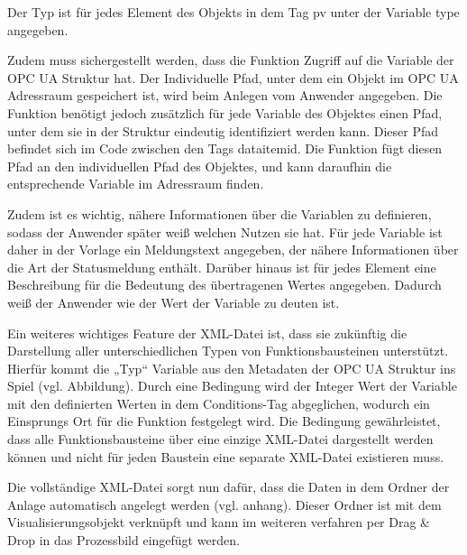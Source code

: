 Der Typ ist für jedes Element des Objekts in dem Tag pv unter der Variable type angegeben.

Zudem muss sichergestellt werden, dass die Funktion Zugriff auf die Variable der OPC UA Struktur hat. Der Individuelle Pfad, unter dem ein Objekt im OPC UA Adressraum gespeichert ist, wird beim Anlegen vom Anwender angegeben. Die Funktion benötigt jedoch zusätzlich für jede Variable des Objektes einen Pfad, unter dem sie in der Struktur eindeutig identifiziert werden kann. Dieser Pfad befindet sich im Code zwischen den Tags dataitemid. Die Funktion fügt diesen Pfad an den individuellen Pfad des Objektes, und kann daraufhin die entsprechende Variable im Adressraum finden.

Zudem ist es wichtig, nähere Informationen über die Variablen zu definieren, sodass der Anwender später weiß welchen Nutzen sie hat. Für jede Variable ist daher in der Vorlage ein Meldungstext angegeben, der nähere Informationen über die Art der Statusmeldung enthält. Darüber hinaus ist für jedes Element eine Beschreibung für die Bedeutung des übertragenen Wertes angegeben. Dadurch weiß der Anwender wie der Wert der Variable zu deuten ist.

Ein weiteres wichtiges Feature der XML-Datei ist, dass sie zukünftig die Darstellung aller unterschiedlichen Typen von Funktionsbausteinen unterstützt. Hierfür kommt die „Typ“ Variable aus den Metadaten der OPC UA Struktur ins Spiel (vgl. Abbildung). Durch eine Bedingung wird der Integer Wert der Variable mit den definierten Werten in dem Conditions-Tag abgeglichen, wodurch ein Einsprungs Ort für die Funktion festgelegt wird. Die Bedingung gewährleistet, dass alle Funktionsbausteine über eine einzige XML-Datei dargestellt werden können und nicht für jeden Baustein eine separate XML-Datei existieren muss. 

Die vollständige XML-Datei sorgt nun dafür, dass die Daten in dem Ordner der Anlage automatisch angelegt werden (vgl. anhang). Dieser Ordner ist mit dem Visualisierungsobjekt verknüpft und kann im weiteren verfahren per Drag & Drop in das Prozessbild eingefügt werden.
